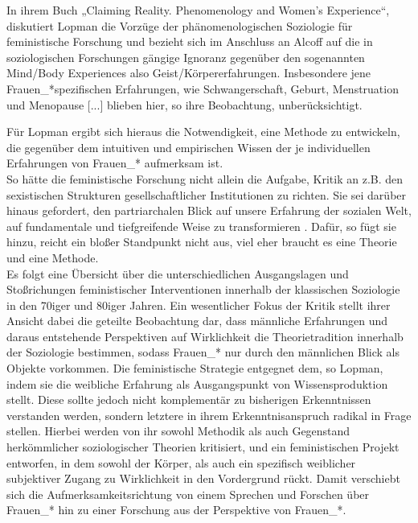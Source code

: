In ihrem Buch „Claiming Reality. Phenomenology and Women's Experience“,
diskutiert Lopman die Vorzüge der phänomenologischen Soziologie für
feministische Forschung und bezieht sich im Anschluss an Alcoff auf die in
soziologischen Forschungen gängige Ignoranz gegenüber den sogenannten
\glqq Mind/Body Experiences \grqq also Geist/Körpererfahrungen. Insbesondere jene
Frauen\_*spezifischen Erfahrungen, wie \glqq Schwangerschaft, Geburt, Menstruation
und Menopause [...]\grqq \footnotemark {} blieben hier, so ihre Beobachtung, unberücksichtigt.

Für Lopman ergibt sich hieraus die Notwendigkeit, eine Methode zu entwickeln,
die gegenüber dem \glqq intuitiven und empirischen Wissen \grqq \footnotemark
{} der je individuellen
Erfahrungen von Frauen\_* aufmerksam ist.\\
 So hätte die feministische Forschung
nicht allein die Aufgabe, Kritik an z.B. den sexistischen Strukturen
gesellschaftlicher Institutionen zu richten. Sie sei darüber hinaus gefordert,
\glqq den partriarchalen Blick auf unsere Erfahrung der sozialen Welt, auf
fundamentale und tiefgreifende Weise zu transformieren \grqq . Dafür, so fügt sie
hinzu, reicht ein bloßer Standpunkt nicht aus, viel eher braucht es eine
Theorie und eine Methode.\\
 Es folgt eine Übersicht über die unterschiedlichen
Ausgangslagen und Stoßrichungen feministischer Interventionen innerhalb der
klassischen Soziologie in den 70iger und 80iger Jahren. Ein wesentlicher Fokus
der Kritik stellt ihrer Ansicht dabei die geteilte Beobachtung dar, dass
männliche Erfahrungen und daraus entstehende Perspektiven auf Wirklichkeit die
Theorietradition innerhalb der Soziologie bestimmen, sodass Frauen\_* nur durch
den männlichen Blick als Objekte vorkommen. Die feministische Strategie
entgegnet dem, so Lopman, indem sie die weibliche Erfahrung als Ausgangspunkt
von Wissensproduktion stellt. Diese sollte jedoch nicht komplementär zu
bisherigen Erkenntnissen verstanden werden, sondern letztere in ihrem
Erkenntnisanspruch radikal in Frage stellen. Hierbei werden von ihr sowohl
Methodik als auch Gegenstand herkömmlicher soziologischer Theorien kritisiert,
und ein feministischen Projekt entworfen, in dem sowohl der Körper, als auch
ein spezifisch weiblicher subjektiver Zugang zu Wirklichkeit in den Vordergrund
rückt. Damit verschiebt sich die Aufmerksamkeitsrichtung von einem Sprechen und
Forschen über Frauen\_* hin zu einer Forschung aus der Perspektive von
Frauen\_*. \footnotemark {}
\\

